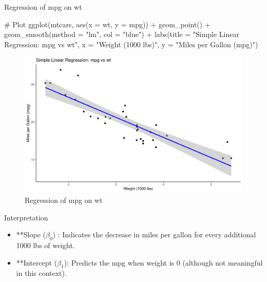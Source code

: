 \documentclass[
  18 pt,
  ignorenonframetext,
  aspectratio=1610,
]{beamer}
\newenvironment{Shaded}{\begin{snugshade}}{\end{snugshade}}
\newcommand{\AttributeTok}[1]{\textcolor[rgb]{0.40,0.45,0.13}{#1}}
\newcommand{\CommentTok}[1]{\textcolor[rgb]{0.37,0.37,0.37}{#1}}
\newcommand{\FunctionTok}[1]{\textcolor[rgb]{0.28,0.35,0.67}{#1}}
\newcommand{\NormalTok}[1]{\textcolor[rgb]{0.00,0.23,0.31}{#1}}
\newcommand{\SpecialCharTok}[1]{\textcolor[rgb]{0.37,0.37,0.37}{#1}}
\newcommand{\StringTok}[1]{\textcolor[rgb]{0.13,0.47,0.30}{#1}}
\begin{document}
\begin{frame}[fragile]{Regression of mpg on wt}
\protect\hypertarget{regression-of-mpg-on-wt-2}{}
\tiny

\begin{Shaded}
\begin{Highlighting}[]
\CommentTok{\# Plot}
\FunctionTok{ggplot}\NormalTok{(mtcars, }\FunctionTok{aes}\NormalTok{(}\AttributeTok{x =}\NormalTok{ wt, }\AttributeTok{y =}\NormalTok{ mpg)) }\SpecialCharTok{+}
  \FunctionTok{geom\_point}\NormalTok{() }\SpecialCharTok{+}
  \FunctionTok{geom\_smooth}\NormalTok{(}\AttributeTok{method =} \StringTok{"lm"}\NormalTok{, }\AttributeTok{col =} \StringTok{"blue"}\NormalTok{) }\SpecialCharTok{+}
  \FunctionTok{labs}\NormalTok{(}\AttributeTok{title =} \StringTok{"Simple Linear Regression: mpg vs wt"}\NormalTok{,}
       \AttributeTok{x =} \StringTok{"Weight (1000 lbs)"}\NormalTok{,}
       \AttributeTok{y =} \StringTok{"Miles per Gallon (mpg)"}\NormalTok{)}
\end{Highlighting}
\end{Shaded}

\begin{figure}

{\centering \includegraphics[width=\textwidth,height=0.5\textheight]{R-Regression_files/figure-beamer/unnamed-chunk-12-1.pdf}

}

\caption{Regression of mpg on wt}

\end{figure}

\normalsize

\begin{block}{Interpretation}
\protect\hypertarget{interpretation}{}
\begin{itemize}
\item
  **Slope (\(\beta_0\)) : Indicates the decrease in miles per gallon for
  every additional 1000 lbs of weight.
\item
  **Intercept (\(\beta_1\)): Predicts the mpg when weight is 0 (although
  not meaningful in this context).
\end{itemize}
\end{block}
\end{frame}
\end{document}
